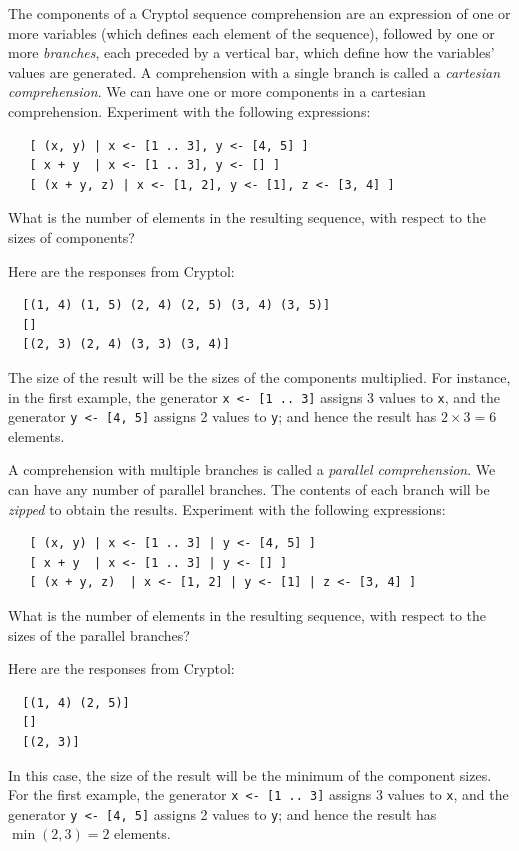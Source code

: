 \begin{Exercise}\label{ex:seq:4}
  The components of a Cryptol sequence comprehension are an expression
  of one or more variables (which defines each element of the
  sequence), followed by one or more \emph{branches}, each preceded by
  a vertical bar, which define how the variables' values are
  generated. A comprehension with a single branch is called a
  \emph{cartesian comprehension}. We can have one or more components
  in a cartesian comprehension. Experiment with the following
  expressions:\indComp\indCartesian
\begin{Verbatim}
   [ (x, y) | x <- [1 .. 3], y <- [4, 5] ]
   [ x + y  | x <- [1 .. 3], y <- [] ]
   [ (x + y, z) | x <- [1, 2], y <- [1], z <- [3, 4] ]
\end{Verbatim}
What is the number of elements in the resulting sequence, with respect
to the sizes of components?

\end{Exercise}
\begin{Answer}
Here are the responses from Cryptol:
\begin{Verbatim}
  [(1, 4) (1, 5) (2, 4) (2, 5) (3, 4) (3, 5)]
  []
  [(2, 3) (2, 4) (3, 3) (3, 4)]
\end{Verbatim}
The size of the result will be the sizes of the components
multiplied. For instance, in the first example, the generator
\texttt{x <- [1 ..\ 3]} assigns 3 values to \texttt{x}, and the generator
\texttt{y <- [4, 5]} assigns 2 values to \texttt{y}; and hence the result has
$2\times 3 = 6$ elements.
\end{Answer}

\begin{Exercise}\label{ex:seq:5}\indParallel\indComp
  A comprehension with multiple branches is called a \emph{parallel
    comprehension}. We can have any number of parallel branches. The
  contents of each branch will be \emph{zipped} to obtain the results.
  Experiment with the following expressions:
\begin{Verbatim}
   [ (x, y) | x <- [1 .. 3] | y <- [4, 5] ]
   [ x + y  | x <- [1 .. 3] | y <- [] ]
   [ (x + y, z)  | x <- [1, 2] | y <- [1] | z <- [3, 4] ]
\end{Verbatim}
What is the number of elements in the resulting sequence, with respect
to the sizes of the parallel branches?
\end{Exercise}
\begin{Answer}
Here are the responses from Cryptol:
\begin{Verbatim}
  [(1, 4) (2, 5)]
  []
  [(2, 3)]
\end{Verbatim}
In this case, the size of the result will be the minimum of the
component sizes. For the first example, the generator
\texttt{x <- [1 ..\ 3]} assigns 3 values to \texttt{x}, and the generator
\texttt{y <- [4, 5]} assigns 2 values to \texttt{y}; and hence the result has
$\min(2,3) = 2$ elements.
\end{Answer}

